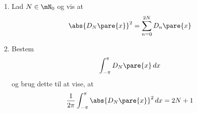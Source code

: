 \begin{opg}\hfill
\begin{enumerate}
    \item Lad $N\in\mN_0$ og vis at
    $$ \abs{D_N\pare{x}}^2 = \sum_{n=0}^{2N} D_n\pare{x} $$
    
    \item Bestem
    $$ \int_{-\pi}^\pi D_N\pare{x} \, dx $$
    og brug dette til at vise, at
    $$ \frac{1}{2\pi}\int_{-\pi}^\pi \abs{D_N\pare{x}}^2 \, dx = 2N+1 $$
\end{enumerate}
\end{opg}